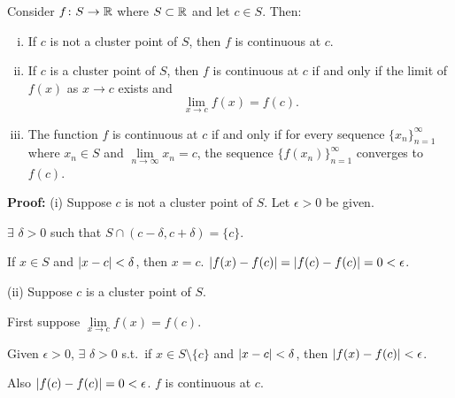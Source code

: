 \documentclass[10pt,aspectratio=169]{beamer}
\begin{document}
\begin{frame}

\begin{proposition}
Consider $f \colon S \to {\mathbb{R}}$ where $S \subset {\mathbb{R}}$
and let $c \in S$.
\pause
Then:
\begin{enumerate}[(i)]
\item If $c$ is not a cluster point of $S$, then $f$ is continuous at $c$.
\item \pause If $c$ is a cluster point of $S$, then $f$ is continuous at $c$
if and only if the limit of $f(x)$ as $x \to c$ exists and
\begin{equation*}
\lim_{x\to c} f(x) = f(c) .
\end{equation*}
\item \pause The function $f$ is continuous at $c$ if and only if for every
sequence $\{ x_n \}_{n=1}^\infty$
where $x_n \in S$ and $\lim\limits_{n\to\infty} x_n = c$, the sequence $\bigl\{ f(x_n) \bigr\}_{n=1}^\infty$ converges
to $f(c)$.
\end{enumerate}
\end{proposition}

\pause

\textbf{Proof:}
(i) Suppose $c$ is not a cluster point of $S$.  Let $\epsilon > 0$ be given.

\pause
$\exists$ $\delta > 0$ such that $S \cap (c-\delta,c+\delta) = \{ c \}$.

\pause
If $x \in S$ and $\left\lvert {x-c} \right\rvert < \delta$, then $x=c$.
\pause
\wthus $\left\lvert {f(x)-f(c)} \right\rvert = \left\lvert {f(c)-f(c)} \right\rvert = 0 < \epsilon$.

\pause
\medskip

(ii)
Suppose $c$ is a cluster point of $S$.

\pause
First suppose $\lim\limits_{x\to c} f(x) = f(c)$.

\pause
Given $\epsilon > 0$, $\exists$ $\delta > 0$ s.t.\ if $x \in S \setminus \{ c \}$
and $\left\lvert {x-c} \right\rvert < \delta$, then $\left\lvert {f(x)-f(c)} \right\rvert < \epsilon$.

\pause
Also $\left\lvert {f(c)-f(c)} \right\rvert = 0 < \epsilon$.
\pause
\wthus $f$ is continuous at $c$.

\end{frame}
\end{document}
